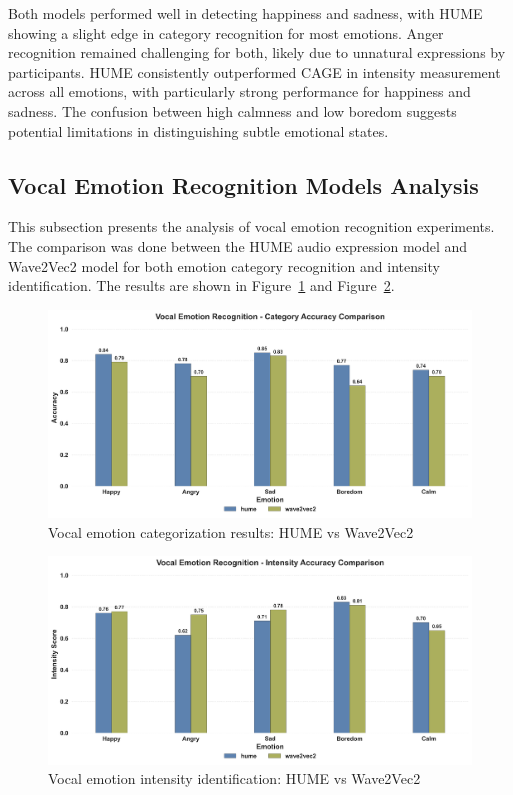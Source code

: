Both models performed well in detecting happiness and sadness, with HUME showing a slight edge in category recognition for most emotions. Anger recognition remained challenging for both, likely due to unnatural expressions by participants. HUME consistently outperformed CAGE in intensity measurement across all emotions, with particularly strong performance for happiness and sadness. The confusion between high calmness and low boredom suggests potential limitations in distinguishing subtle emotional states.


\subsection{Vocal Emotion Recognition Models Analysis}
This subsection presents the analysis of vocal emotion recognition experiments. The comparison was done between the HUME audio expression model and Wave2Vec2 model for both emotion category recognition and intensity identification. The results are shown in Figure~\ref{fig:vocal-category} and Figure~\ref{fig:vocal-intensity}.


\begin{figure}[H]
    \centering
    \includegraphics[width=1\textwidth]{img/chapter_04/vocal_category_comparison}
    \caption{Vocal emotion categorization results: HUME vs Wave2Vec2}
    \label{fig:vocal-category}
\end{figure}

\begin{figure}[H]
    \centering
    \includegraphics[width=1\textwidth]{img/chapter_04/vocal_intensity_comparison}
    \caption{Vocal emotion intensity identification: HUME vs Wave2Vec2}
    \label{fig:vocal-intensity}
\end{figure}


